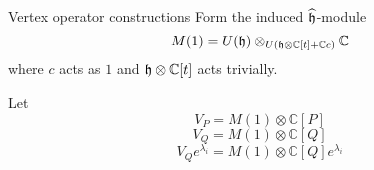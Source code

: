 \documentclass{beamer}
\begin{document}
\begin{frame}{Vertex operator constructions}
Form the induced $\widehat{\frak{h}}$-module
$$M(1) = U(\frak{h}) \otimes_{U(\frak{h}\otimes\mathbb{C}[t] + \mathbb{C}c)} \mathbb{C}$$
where $c$ acts as $1$ and $\frak{h}\otimes\mathbb{C}[t]$ acts trivially.\\
\pause



Let
$$V_P = M(1) \otimes \mathbb{C}[P]$$
$$V_Q = M(1) \otimes \mathbb{C}[Q]$$
$$V_Qe^{\lambda_i} = M(1) \otimes \mathbb{C}[Q]e^{\lambda_i}$$





\end{frame}
\end{document}

